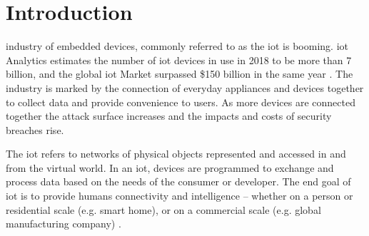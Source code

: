 \documentclass[conference]{IEEEtran}
\begin{document}
\glsresetall
\section{Introduction}




 industry of embedded devices, commonly referred to as the \gls{iot} is booming. \gls{iot} Analytics estimates the number of \gls{iot} devices in use in 2018 to be more than 7 billion, and the global \gls{iot} Market surpassed \$150 billion in the same year \cite{Scully2017}. The industry is marked by the connection of everyday appliances and devices together to collect data and provide convenience to users. As more devices are connected together the attack surface increases and the impacts and costs of security breaches rise.

\bigskip

The \gls{iot} refers to networks of physical objects represented and accessed in and from the virtual world. In an \gls{iot}, devices are programmed to exchange and process data based on the needs of the consumer or developer. The end goal of \gls{iot} is to provide humans connectivity and intelligence -- whether on a person or residential scale (e.g. smart home), or on a commercial scale (e.g. global manufacturing company) \cite{Li2015}. 

\bigskip
\end{document}

